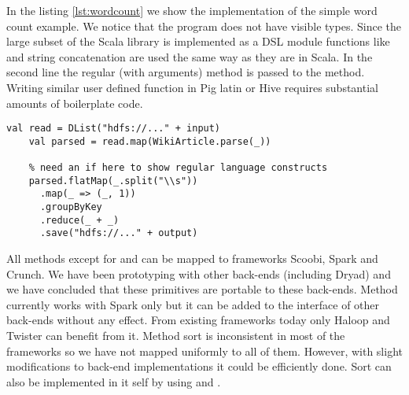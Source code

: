In the listing \ref{lst:wordcount} we show the implementation of the simple word count example. We notice that the program does not have visible  types. Since the large subset of the Scala library is implemented as a DSL module functions like  and string concatenation are used the same way as they are in Scala. In the second line the regular (with  arguments) method is passed to the  method. Writing similar user defined function in Pig latin or Hive requires substantial amounts of boilerplate code.  

\begin{lstlisting}[name=code, caption=Example of word count program where type inference removes the need to declare any \scode{Rep} types., captionpos=b, label=lst:wordcount, float=t]
    val read = DList("hdfs://..." + input)
    val parsed = read.map(WikiArticle.parse(_))
    
    % need an if here to show regular language constructs
    parsed.flatMap(_.split("\\s"))
      .map(_ => (_, 1))
      .groupByKey
      .reduce(_ + _)
      .save("hdfs://..." + output)

\end{lstlisting}

All methods except for  and  can be mapped to frameworks Scoobi, Spark and Crunch. We have been prototyping with other back-ends (including Dryad) and we have concluded that these primitives are portable to these back-ends. Method  currently works with Spark  only but it can be added to the interface of other back-ends without any effect. From existing frameworks today only Haloop and Twister  can benefit from it. Method sort is inconsistent in most of the frameworks so we have not mapped uniformly to all of them. However, with slight modifications to back-end implementations it could be efficiently done. Sort can also be implemented in \tool it self by using  and .

